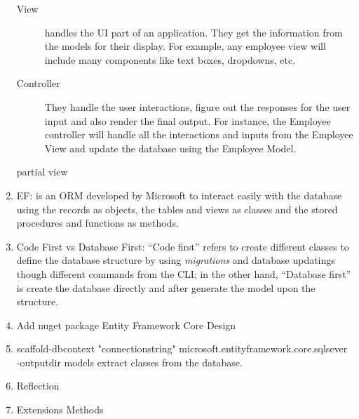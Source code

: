 \begin{multicols}{2}
\begin{enumerate}
\begin{description}
\item[View] handles the UI part of an application. They get the information from the models for their display. For example, any employee view will include many components like text boxes, dropdowns, etc.
\item[Controller] They handle the user interactions, figure out the responses for the user input and also render the final output. For instance, the Employee controller will handle all the interactions and inputs from the Employee View and update the database using the Employee Model.
\item[partial view]
\end{description}
\item EF: is an ORM developed by Microsoft to interact easily with the database using the records as objects, the tables and views as classes and the stored procedures and functions as methods.
\item Code First vs Database First: ``Code first'' refers to create different classes to define the database structure by using \emph{migrations} and database updatings though different commands from the CLI; in the other hand, ``Database first'' is create the database directly and after generate the model upon the structure.
\item Add nuget package Entity Framework Core Design
\item scaffold-dbcontext "connectionstring" microsoft.entityframework.core.sqlsever -outputdir models extract classes from the database. 
\item Reflection 
\item Extensions Methods

\end{enumerate}
\end{multicols}

